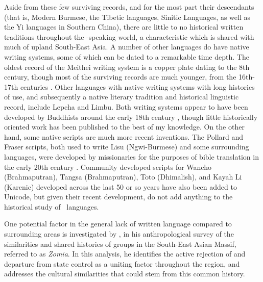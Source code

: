 Aside from these few surviving records, and for the most part their descendants (that is, Modern Burmese, the Tibetic languages, Sinitic Languages, as well as the Yi languages in Southern China), there are little to no historical written traditions throughout the \lfam-speaking world, a characteristic which is shared with much of upland South-East Asia. A number of other languages do have native writing systems, some of which can be dated to a remarkable time depth. The oldest record of the Meithei writing system is a copper plate dating to the 8th century, though most of the surviving records are much younger, from the 16th-17th centuries \cite{Chelliah2000}. Other languages with native writing systems with long histories of use, and subsequently a native literary tradition and historical linguistic record, include Lepcha and Limbu. Both writing systems appear to have been developed by Buddhists around the early 18th century \cite{Plaisier2007}, though little historically oriented work has been published to the best of my knowledge. On the other hand, some native scripts are much more recent inventions. The Pollard and Fraser scripts, both used to write Lisu (Ngwi-Burmese) and some surrounding languages, were developed by missionaries for the purposes of bible translation in the early 20th century \cite{Bradley2017}. Community developed scripts for Wancho (Brahmaputran), Tangsa (Brahmaputran), Toto (Dhimalish), and Kayah Li (Karenic) developed across the last 50 or so years have also been added to Unicode, but given their recent development, do not add anything to the historical study of \lfam\ languages.

One potential factor in the general lack of written language compared to surrounding areas is investigated by , in his anthropological survey of the similarities and shared histories of groups in the South-East Asian Massif, referred to as \textit{Zomia}. In this analysis, he identifies the active rejection of and departure from state control as a uniting factor throughout the region, and addresses the cultural similarities that could stem from this common history.


